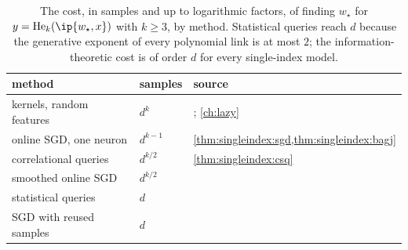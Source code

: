 \begin{refsection}
\begin{table}[t]
\centering\small
\caption{The cost, in samples and up to logarithmic factors, of finding $w_\star$ for $y=\He_k(\ip{w_\star,x})$ with $k\ge3$, by method. Statistical queries reach $d$ because the generative exponent of every polynomial link is at most $2$; the information-theoretic cost is of order $d$ for every single-index model.}\label{tab:singleindex:ladder}
\begin{tabular}{@{}lll@{}}
\toprule
method & samples & source\\
\midrule
kernels, random features & $d^k$ & \parencite{GhorbaniEtAl2021}; \cref{ch:lazy}\\
online SGD, one neuron & $d^{k-1}$ & \cref{thm:singleindex:sgd,thm:singleindex:bagj}\\
correlational queries & $d^{k/2}$ & \cref{thm:singleindex:csq}\\
smoothed online SGD & $d^{k/2}$ & \parencite{DamianEtAl2023}\\
statistical queries & $d$ & \parencite{DamianEtAl2024}\\
SGD with reused samples & $d$ & \parencite{LeeEtAl2024}\\
\bottomrule
\end{tabular}
\end{table}


\end{refsection}
